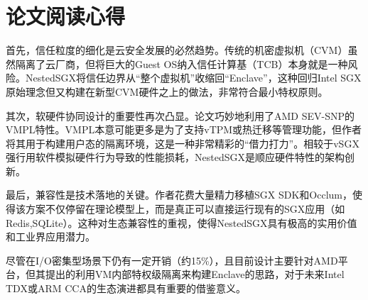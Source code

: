 \section{论文阅读心得}
首先，信任粒度的细化是云安全发展的必然趋势。传统的机密虚拟机（CVM）虽然隔离了云厂商，但将巨大的Guest OS纳入信任计算基（TCB）本身就是一种风险。NestedSGX将信任边界从“整个虚拟机”收缩回“Enclave”，这种回归Intel SGX原始理念但又构建在新型CVM硬件之上的做法，非常符合最小特权原则。

其次，软硬件协同设计的重要性再次凸显。论文巧妙地利用了AMD SEV-SNP的VMPL特性。VMPL本意可能更多是为了支持vTPM或热迁移等管理功能，但作者将其用于构建用户态的隔离环境，这是一种非常精彩的“借力打力”。相较于vSGX强行用软件模拟硬件行为导致的性能损耗，NestedSGX是顺应硬件特性的架构创新。

最后，兼容性是技术落地的关键。作者花费大量精力移植SGX SDK和Occlum，使得该方案不仅停留在理论模型上，而是真正可以直接运行现有的SGX应用（如Redis,SQLite）。这种对生态兼容性的重视，使得NestedSGX具有极高的实用价值和工业界应用潜力。

尽管在I/O密集型场景下仍有一定开销（约15\%），且目前设计主要针对AMD平台，但其提出的利用VM内部特权级隔离来构建Enclave的思路，对于未来Intel TDX或ARM CCA的生态演进都具有重要的借鉴意义。

\nocite{*}
\printbibliography
